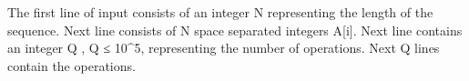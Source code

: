 The first line of input consists of an integer N representing the length of the sequence. Next line consists of N space separated integers A[i]. Next line contains an integer Q , Q ≤ 10^5, representing the number of operations. Next Q lines contain the operations.